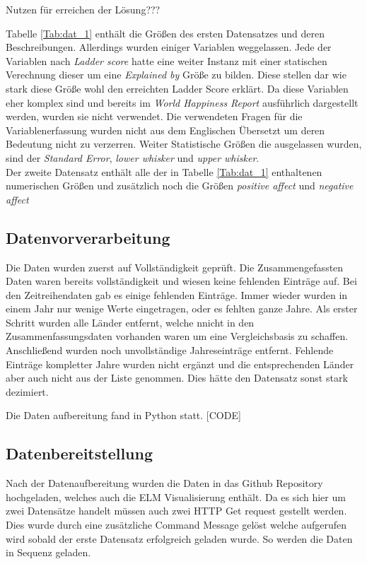 Nutzen für erreichen der Lösung???

Tabelle \ref{Tab:dat_1} enthält die Größen des ersten Datensatzes und deren Beschreibungen. Allerdings wurden einiger Variablen weggelassen. Jede der Variablen nach \textit{Ladder score} hatte eine weiter Instanz mit einer statischen Verechnung dieser um eine \textit{Explained by} Größe zu bilden. Diese stellen dar wie stark diese Größe wohl den erreichten Ladder Score erklärt. Da diese Variablen eher komplex sind und bereits im \textit{World Happiness Report}  ausführlich dargestellt werden, wurden sie nicht verwendet. Die verwendeten Fragen für die Variablenerfassung wurden nicht aus dem Englischen Übersetzt um deren Bedeutung nicht zu verzerren. Weiter Statistische Größen die ausgelassen wurden, sind der \textit{Standard Error}, \textit{lower whisker} und \textit{upper whisker}. \\

Der zweite Datensatz enthält alle der in Tabelle \ref{Tab:dat_1} enthaltenen numerischen Größen und zusätzlich noch die Größen \textit{positive affect} und \textit{negative affect}




\subsection{Datenvorverarbeitung}

Die Daten wurden zuerst auf Vollständigkeit geprüft. Die Zusammengefassten Daten waren bereits vollständigkeit und wiesen keine fehlenden Einträge auf. Bei den Zeitreihendaten gab es einige fehlenden Einträge. Immer wieder wurden in einem Jahr nur wenige Werte eingetragen, oder es fehlten ganze Jahre. Als erster Schritt wurden alle Länder entfernt, welche nnicht in den Zusammenfassungsdaten vorhanden waren um eine Vergleichsbasis zu schaffen. Anschließend wurden noch unvollständige Jahreseinträge entfernt. Fehlende Einträge kompletter Jahre wurden nicht ergänzt und die entsprechenden Länder aber auch nicht aus der Liste genommen. Dies hätte den Datensatz sonst stark dezimiert. 

Die Daten aufbereitung fand in Python statt. 
[CODE]

\subsection{Datenbereitstellung}

Nach der Datenaufbereitung wurden die Daten in das Github Repository hochgeladen, welches auch die ELM Visualisierung enthält. Da es sich hier um zwei Datensätze handelt müssen auch zwei HTTP Get request gestellt werden. Dies wurde durch eine zusätzliche Command Message gelöst welche aufgerufen wird sobald der erste Datensatz erfolgreich geladen wurde. So werden die Daten in Sequenz geladen. 